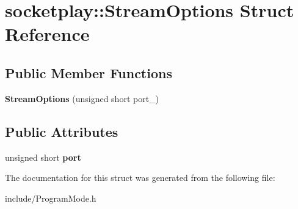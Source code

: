 \hypertarget{structsocketplay_1_1StreamOptions}{}\section{socketplay\+:\+:Stream\+Options Struct Reference}
\label{structsocketplay_1_1StreamOptions}
\subsection*{Public Member Functions}
\begin{DoxyCompactItemize}
\item 
{\bfseries Stream\+Options} (unsigned short port\+\_\+)\hypertarget{structsocketplay_1_1StreamOptions_ae6182a50afd5dc7c357a28dbe6ab3538}{}\label{structsocketplay_1_1StreamOptions_ae6182a50afd5dc7c357a28dbe6ab3538}

\end{DoxyCompactItemize}
\subsection*{Public Attributes}
\begin{DoxyCompactItemize}
\item 
unsigned short {\bfseries port}\hypertarget{structsocketplay_1_1StreamOptions_a2660cf7afd85f605733e6ec74a936c70}{}\label{structsocketplay_1_1StreamOptions_a2660cf7afd85f605733e6ec74a936c70}

\end{DoxyCompactItemize}


The documentation for this struct was generated from the following file\+:\begin{DoxyCompactItemize}
\item 
include/Program\+Mode.\+h\end{DoxyCompactItemize}
